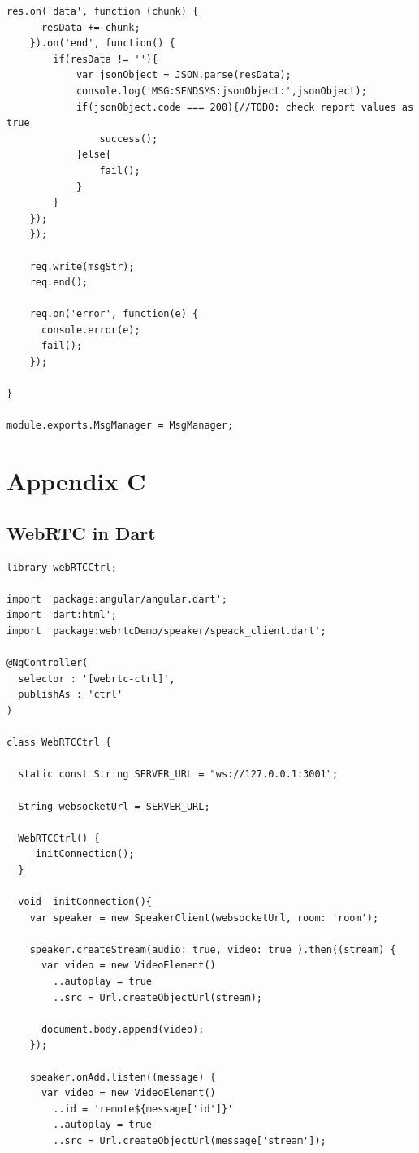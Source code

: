 \begin{appendices}
\begin{lstlisting}[caption={msg.js on Application Server},label={code:msg}]
	  res.on('data', function (chunk) {
      resData += chunk;
    }).on('end', function() {
    	if(resData != ''){
    		var jsonObject = JSON.parse(resData);
    		console.log('MSG:SENDSMS:jsonObject:',jsonObject);
    		if(jsonObject.code === 200){//TODO: check report values as true
    			success();
    		}else{
    			fail();
    		}
    	}
    });
	});

	req.write(msgStr);
	req.end();

	req.on('error', function(e) {
	  console.error(e);
	  fail();
	});

}

module.exports.MsgManager = MsgManager;
\end{lstlisting}

\chapter{Appendix C}

\section{WebRTC in Dart} \label{research:dart_webrtcctrl}

\begin{lstlisting}[caption={WebRTCCtrl in Dart application client},label={code:dart_webrtcctrl}]
library webRTCCtrl;

import 'package:angular/angular.dart';
import 'dart:html';
import 'package:webrtcDemo/speaker/speack_client.dart';

@NgController(
  selector : '[webrtc-ctrl]',
  publishAs : 'ctrl'
)

class WebRTCCtrl {

  static const String SERVER_URL = "ws://127.0.0.1:3001";

  String websocketUrl = SERVER_URL;

  WebRTCCtrl() {
    _initConnection();
  }

  void _initConnection(){
    var speaker = new SpeakerClient(websocketUrl, room: 'room');

    speaker.createStream(audio: true, video: true ).then((stream) {
      var video = new VideoElement()
        ..autoplay = true
        ..src = Url.createObjectUrl(stream);

      document.body.append(video);
    });

    speaker.onAdd.listen((message) {
      var video = new VideoElement()
        ..id = 'remote${message['id']}'
        ..autoplay = true
        ..src = Url.createObjectUrl(message['stream']);


\end{lstlisting}
\end{appendices}
